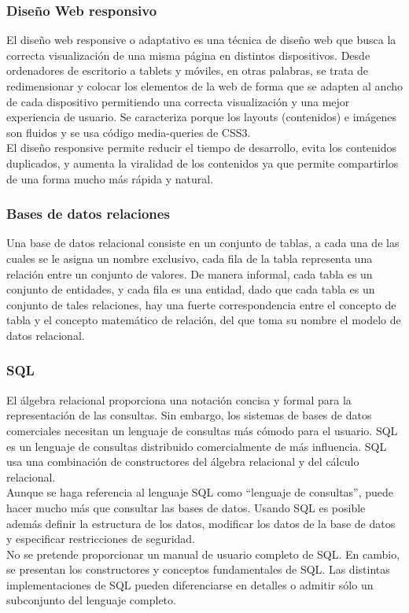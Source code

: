 		
		\subsubsection{Diseño Web responsivo}
		
		{El diseño web responsive o adaptativo es una técnica de diseño web que busca la correcta visualización de una misma página en distintos dispositivos. Desde ordenadores de escritorio a tablets y móviles, en otras palabras, se trata de redimensionar y colocar los elementos de la web de forma que se adapten al ancho de cada dispositivo permitiendo una correcta visualización y una mejor experiencia de usuario. Se caracteriza porque los layouts (contenidos) e imágenes son fluidos y se usa código media-queries de CSS3.\\
			
		El diseño responsive permite reducir el tiempo de desarrollo, evita los contenidos duplicados, y aumenta la viralidad de los contenidos ya que permite compartirlos de una forma mucho más rápida y natural.}
	
		
		\subsubsection{Bases de datos relaciones}
		
		{Una base de datos relacional consiste en un conjunto de tablas, a cada una de las cuales se le asigna un nombre exclusivo, cada fila de la tabla representa una relación entre un conjunto de valores. De manera informal, cada tabla es un conjunto de entidades, y cada fila es una entidad, dado que cada tabla es un conjunto de tales relaciones, hay una fuerte correspondencia entre el concepto de tabla y el concepto matemático de relación, del que toma su nombre el modelo de datos relacional.}
	
		\subsubsection{SQL}
		
		{El álgebra relacional proporciona una notación concisa y formal para la representación de las consultas. Sin embargo, los sistemas de bases de datos comerciales necesitan un lenguaje de consultas más cómodo para el usuario. SQL es un lenguaje de consultas distribuido comercialmente de más influencia. SQL usa una combinación de constructores del álgebra relacional y del cálculo relacional.\\
			
		Aunque se haga referencia al lenguaje SQL como “lenguaje de consultas”, puede hacer mucho más que consultar las bases de datos. Usando SQL es posible además definir la estructura de los datos, modificar los datos de la base de datos y especificar restricciones de seguridad.\\
	
		No se pretende proporcionar un manual de usuario completo de SQL. En cambio, se presentan los constructores y conceptos fundamentales de SQL. Las distintas implementaciones de SQL pueden diferenciarse en detalles o admitir sólo un subconjunto del lenguaje completo.}
	
